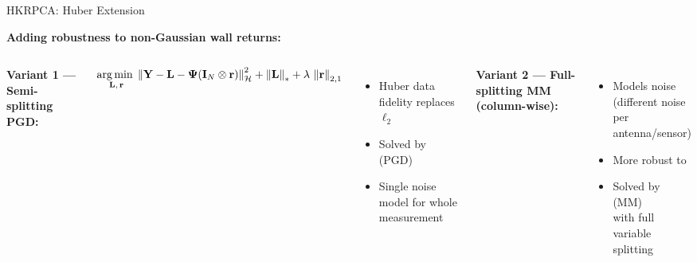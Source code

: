 \begin{frame}{HKRPCA: Huber Extension \skipbadge{}}

  \textbf{Adding robustness to non-Gaussian wall returns:}

  \vspace{0.4em}
  \begin{columns}[T]
      \vspace{0.2em}
      \textbf{Variant 1 --- Semi-splitting PGD:}

      \begin{shibuiframe}{ }
        \footnotesize
        \[
          \underset{\mathbf{L},\,\mathbf{r}}{\operatorname*{arg\,min}\;}
            \left\| \mathbf{Y} - \mathbf{L}
              - \boldsymbol{\Psi}(\mathbf{I}_{N}\otimes\mathbf{r}) \right\|_{\mathcal{H}}^{2}
            + \left\| \mathbf{L} \right\|_{*}
            + \lambda\,\left\| \mathbf{r} \right\|_{2,1}
        \]
      \end{shibuiframe}

      \vspace{0.3em}
      \begin{itemize}
        \item Huber data fidelity replaces $\ell_2$
        \item Solved by  (PGD)
        \item Single noise model for whole measurement
      \end{itemize}

      \vspace{0.2em}
      \textbf{Variant 2 --- Full-splitting MM (column-wise):}

      \vspace{0.3em}
      \begin{itemize}
        \item Models noise \\
              (different noise per antenna/sensor)
        \item More robust to 
        \item Solved by  (MM)\\
              with full variable splitting
      \end{itemize}
  \end{columns}


\end{frame}
